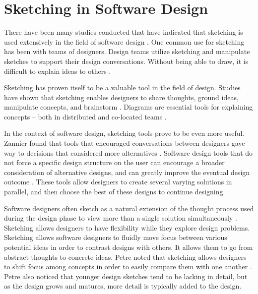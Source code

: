 \section{Sketching in Software Design}

There have been many studies conducted that have indicated that sketching is used extensively in the field of software design \cite{petre, zannier, dekel}. One common use for sketching has been with teams of designers. Design teams utilize sketching and manipulate sketches to support their design conversations. Without being able to draw, it is difficult to explain ideas to others \cite{dekel, petre}.

Sketching has proven itself to be a valuable tool in the field of design. Studies have shown that sketching enables designers to share thoughts, ground ideas, manipulate concepts, and brainstorm \cite{cherubini}. Diagrams are essential tools for explaining concepts -- both in distributed and co-located teams \cite{yatani}.

In the context of software design, sketching tools prove to be even more useful. Zannier found that tools that encouraged conversations between designers gave way to decisions that considered more alternatives \cite{zannier}. Software design tools that do not force a specific design structure on the user can encourage a broader consideration of alternative designs, and can greatly improve the eventual design outcome \cite{zannier}. These tools allow designers to create several varying solutions in parallel, and then choose the best of these designs to continue designing. 

Software designers often sketch as a natural extension of the thought process used during the design phase to view more than a single solution simultaneously \cite{petre}. Sketching allows designers to have flexibility while they explore design problems. Sketching allows software designers to fluidly move focus between various potential ideas in order to contrast designs with others. It allows them to go from abstract thoughts to concrete ideas. Petre noted that sketching allows designers to shift focus among concepts in order to easily compare them with one another \cite{petre}. Petre also noticed that younger design sketches tend to be lacking in detail, but as the design grows and matures, more detail is typically added to the design.

